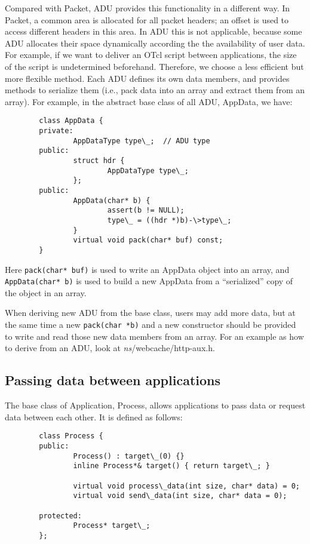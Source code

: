 Compared with Packet, ADU provides this functionality in a different
way. In Packet, a common area is allocated for all packet headers; an
offset is used to access different headers in this area. In ADU this
is not applicable, because some ADU allocates their space dynamically
according the the availability of user data. For example, if we want
to deliver an OTcl script between applications, the size of the script
is undetermined beforehand. Therefore, we choose a less efficient but
more flexible method. Each ADU defines its own data members, and
provides methods to serialize them (i.e., pack data into an array and
extract them from an array). For example, in the abstract base class
of all ADU, AppData, we have:

\begin{verbatim}
        class AppData {
        private:
                AppDataType type\_;  // ADU type
        public:
                struct hdr {
                        AppDataType type\_;
                };
        public:
                AppData(char* b) {
                        assert(b != NULL);
                        type\_ = ((hdr *)b)-\>type\_;
                }
                virtual void pack(char* buf) const;
        }
\end{verbatim}

Here {\tt pack(char* buf)} is used to write an AppData object
into an array, and {\tt AppData(char* b)} is used to build a new
AppData from a ``serialized'' copy of the object in an array.

When deriving new ADU from the base class, users may add more data,
but at the same time a new {\tt pack(char *b)} and a new constructor 
should be provided to write and read those new data members from an
array. For an example as how to derive from an ADU, look at 
\emph{ns}/webcache/http-aux.h.

\subsection{Passing data between applications}

The base class of Application, Process, allows applications to pass
data or request data between each other. It is defined as follows:
\begin{verbatim}
        class Process {
        public: 
                Process() : target\_(0) {}
                inline Process*& target() { return target\_; }

                virtual void process\_data(int size, char* data) = 0;
                virtual void send\_data(int size, char* data = 0);

        protected:
                Process* target\_;
        };
\end{verbatim}

